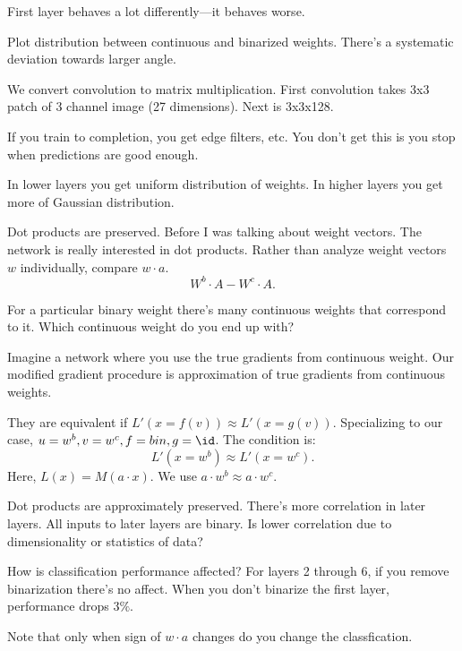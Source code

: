 

First layer behaves a lot differently---it behaves worse. 

Plot distribution between continuous and binarized weights. There's a systematic deviation towards larger angle.

We convert convolution to matrix multiplication. First convolution takes 3x3 patch of 3 channel image (27 dimensions). Next is 3x3x128.

If you train to completion, you get edge filters, etc. You don't get this is you stop when predictions are good enough.

In lower layers you get uniform distribution of weights.
In higher layers you get more of Gaussian distribution.

Dot products are preserved. Before I was talking about weight vectors. The network is really interested in dot products. Rather than analyze weight vectors $w$ individually, compare $w\cdot a$.
$$
W^b\cdot A - W^c\cdot A.
$$

For a particular binary weight there's many continuous weights that correspond to it. Which continuous weight do you end up with?

Imagine a network where you use the true gradients from continuous weight. Our modified gradient procedure is approximation of true gradients from continuous weights. 

They are equivalent if $L'(x=f(v)) \approx L'(x=g(v))$. Specializing to our case, $u=w^b, v=w^c, f=bin, g=\id$.
The condition is:
$$L'(x=w^b) \approx L'(x=w^c).$$
Here, $L(x) = M(a\cdot x)$.  We use $a\cdot w^b \approx a\cdot w^c$.

Dot products are approximately preserved. There's more correlation in later layers. %
All inputs to later layers are binary.
Is lower correlation due to dimensionality or statistics of data?




How is classification performance affected? For layers 2 through 6, if you remove binarization there's no affect. When you don't binarize the first layer, performance drops $3\%$.

Note that only when sign of $w\cdot a$ changes do you change the classfication.

